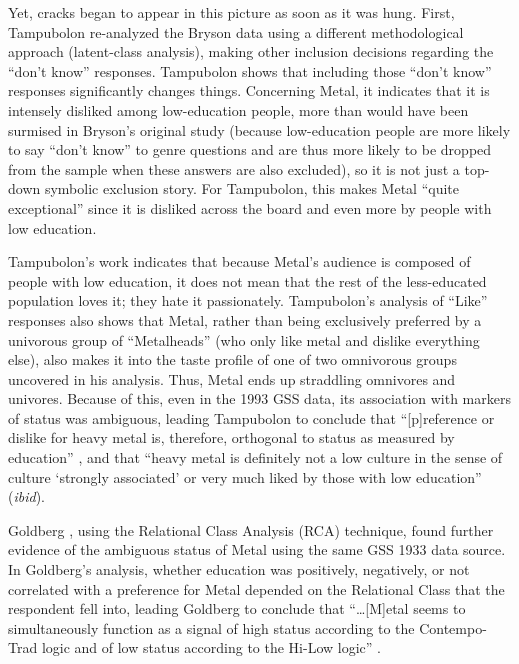 \documentclass[a4paper,12pt]{extarticle}
\begin{document}
Yet, cracks began to appear in this picture as soon as it was hung. First, Tampubolon \citeyearpar{tampubolon2008revisiting} re-analyzed the Bryson data using a different methodological approach (latent-class analysis), making other inclusion decisions regarding the ``don't know'' responses. Tampubolon shows that including those ``don't know'' responses significantly changes things. Concerning Metal, it indicates that it is intensely disliked among low-education people, more than would have been surmised in Bryson's original study (because low-education people are more likely to say ``don't know'' to genre questions and are thus more likely to be dropped from the sample when these answers are also excluded), so it is not just a top-down symbolic exclusion story. For Tampubolon, this makes Metal ``quite exceptional'' since it is disliked across the board and even more by people with low education. 

Tampubolon's work indicates that because Metal's audience is composed of people with low education, it does not mean that the rest of the less-educated population loves it; they hate it passionately. Tampubolon's analysis of ``Like'' responses also shows that Metal, rather than being exclusively preferred by a univorous group of ``Metalheads'' (who only like metal and dislike everything else), also makes it into the taste profile of one of two omnivorous groups uncovered in his analysis. Thus, Metal ends up straddling omnivores and univores. Because of this, even in the 1993 GSS data, its association with markers of status was ambiguous, leading Tampubolon to conclude that ``[p]reference or dislike for heavy metal is, therefore, orthogonal to status as measured by education'' \citeyearpar[][257]{tampubolon2008revisiting}, and that ``heavy metal is definitely not a low culture in the sense of culture `strongly associated' or very much liked by those with low education'' (\textit{ibid}). 

Goldberg \citeyearpar{goldberg2011mapping}, using the Relational Class Analysis (RCA) technique, found further evidence of the ambiguous status of Metal using the same GSS 1933 data source. In Goldberg's analysis, whether education was positively, negatively, or not correlated with a preference for Metal depended on the Relational Class that the respondent fell into, leading Goldberg to conclude that ``\ldots [M]etal seems to simultaneously function as a signal of high status according to the Contempo-Trad logic and of low status according to the Hi-Low logic'' \citeyearpar[][1421]{goldberg2011mapping}.
\end{document}
